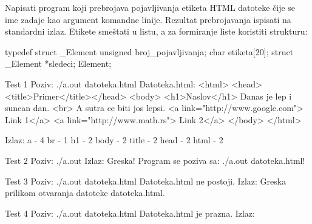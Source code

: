 \begin{Exercise}[label=608]
Napisati program koji prebrojava pojavljivanja etiketa HTML 
datoteke čije se ime zadaje kao argument komandne linije. Rezultat prebrojavanja 
ispisati na standardni izlaz. Etikete smeštati u listu, a za formiranje liste koristiti strukturu:
\begin{ckod} 
 typedef struct _Element
 {
   unsigned broj_pojavljivanja;
   char etiketa[20];
   struct _Element *sledeci;
 } Element;
\end{ckod}

\begin{maxitest}
    \begin{test}{Test 1}
Poziv: ./a.out datoteka.html
Datoteka.html:                                     
<html>                                             
  <head><title>Primer</title></head>               
  <body>                                           
    <h1>Naslov</h1>                                
    Danas je lep i suncan dan. <br>                
    A sutra ce biti jos lepsi.                     
    <a link="http://www.google.com"> Link 1</a>    
    <a link="http://www.math.rs"> Link 2</a>
  </body>
</html>

Izlaz:  a - 4
        br - 1
        h1 - 2
        body - 2
        title - 2
        head - 2
        html - 2
    \end{test}
\end{maxitest}

\begin{maxitest}
    \begin{test}{Test 2}
Poziv: ./a.out 
Izlaz: Greska! Program se poziva sa: ./a.out datoteka.html!
    \end{test}
\end{maxitest}


\begin{maxitest}
    \begin{test}{Test 3}
Poziv: ./a.out datoteka.html
Datoteka.html ne postoji.
Izlaz: Greska prilikom otvaranja datoteke datoteka.html.
    \end{test}
\end{maxitest}

\begin{maxitest}
    \begin{test}{Test 4}
Poziv: ./a.out datoteka.html
Datoteka.html je prazna.
Izlaz: 
    \end{test}
\end{maxitest}



\end{Exercise}
\begin{Answer}[ref=608]
\end{Answer}



